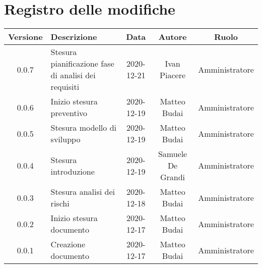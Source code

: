 \section*{Registro delle modifiche}

\begin{center}
	\begin{longtable}{|c|p{5cm}|c|c|c|}
	\hline
	\rowcolor{lighter-grayer}
	\textbf{Versione} & \textbf{Descrizione} & \textbf{Data} & \textbf{Autore} & \textbf{Ruolo} \\
	\hline
	\endfirsthead

	0.0.7 & Stesura pianificazione fase di analisi dei requisiti & 2020-12-21 & Ivan Piacere & Amministratore \\
	\hline
	0.0.6 & Inizio stesura preventivo & 2020-12-19 & Matteo Budai & Amministratore \\
	\hline
	0.0.5 & Stesura modello di sviluppo & 2020-12-19 & Matteo Budai & Amministratore \\
	\hline
	0.0.4 & Stesura introduzione & 2020-12-19 & Samuele De Grandi & Amministratore \\
	\hline
	0.0.3 & Stesura analisi dei rischi & 2020-12-18 & Matteo Budai & Amministratore \\
	\hline
	0.0.2 & Inizio stesura documento & 2020-12-17 & Matteo Budai & Amministratore \\
	\hline
	0.0.1 & Creazione documento & 2020-12-17 & Matteo Budai & Amministratore \\
	\hline

	\end{longtable}
\end{center}